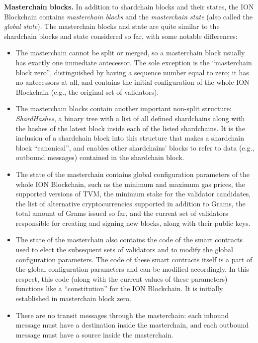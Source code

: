 \documentclass[12pt,oneside]{article}
\def\makepoint#1{\medbreak\noindent{\bf #1.\ }}
\def\nxsubpoint{\refstepcounter{subsubsection}%
  \smallbreak\makepoint{\thesubsubsection}}
\def\emb#1{\textbf{#1.}}
\begin{document}
\nxsubpoint\emb{Masterchain blocks}
In addition to shardchain blocks and their states, the ION Blockchain contains {\em masterchain blocks\/} and the {\em masterchain state\/} (also called the {\em global state}). The masterchain blocks and state are quite similar to the shardchain blocks and state considered so far, with some notable differences:
\begin{itemize}
\item The masterchain cannot be split or merged, so a masterchain block usually has exactly one immediate antecessor. The sole exception is the ``masterchain block zero'', distinguished by having a sequence number equal to zero; it has no antecessors at all, and contains the initial configuration of the whole ION Blockchain (e.g., the original set of validators).
\item The masterchain blocks contain another important non-split structure: {\em ShardHashes}, a binary tree with a list of all defined shardchains along with the hashes of the latest block inside each of the listed shardchains. It is the inclusion of a shardchain block into this structure that makes a shardchain block ``canonical'', and enables other shardchains' blocks to refer to data (e.g., outbound messages) contained in the shardchain block.
\item The state of the masterchain contains global configuration parameters of the whole ION Blockchain, such as the minimum and maximum gas prices, the supported versions of TVM, the minimum stake for the validator candidates, the list of alternative cryptocurrencies supported in addition to Grams, the total amount of Grams issued so far, and the current set of validators responsible for creating and signing new blocks, along with their public keys.
\item The state of the masterchain also contains the code of the smart contracts used to elect the subsequent sets of validators and to modify the global configuration parameters. The code of these smart contracts itself is a part of the global configuration parameters and can be modified accordingly. In this respect, this code (along with the current values of these parameters) functions like a ``constitution'' for the ION Blockchain. It is initially established in masterchain block zero.
\item There are no transit messages through the masterchain: each inbound message must have a destination inside the masterchain, and each outbound message must have a source inside the masterchain.
\end{itemize}
\end{document}
